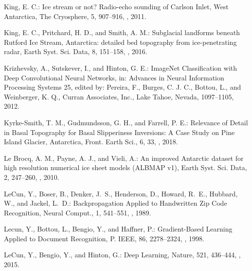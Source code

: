 \documentclass[tc, noline]{copernicus}
\begin{document}
\begin{thebibliography}{95}
King, E. C.: Ice stream or not? Radio-echo sounding of Carlson Inlet, West Antarctica, The Cryosphere, 5, 907--916, , 2011.

King, E. C., Pritchard, H. D., and Smith, A. M.: Subglacial landforms beneath Rutford Ice Stream, Antarctica: detailed bed topography from ice-penetrating radar, Earth Syst. Sci. Data, 8, 151--158, , 2016.

Krizhevsky, A., Sutskever, I., and Hinton, G. E.: ImageNet Classification with Deep Convolutional Neural Networks, in: Advances in Neural Information Processing Systems 25, edited by: Pereira, F., Burges, C. J. C., Bottou, L., and Weinberger, K. Q., Curran Associates, Inc., Lake Tahoe, Nevada, 1097--1105, 2012.

Kyrke-Smith, T. M., Gudmundsson, G. H., and Farrell, P. E.: Relevance of Detail in Basal Topography for Basal Slipperiness Inversions: A Case Study on Pine Island Glacier, Antarctica, Front. Earth Sci., 6, 33, , 2018.


Le Brocq, A. M., Payne, A. J., and Vieli, A.: An improved Antarctic dataset for high resolution numerical ice sheet models (ALBMAP v1), Earth Syst. Sci. Data, 2, 247--260, , 2010.

LeCun, Y., Boser, B., Denker, J.~S., Henderson, D., Howard, R.~E., Hubbard, W., and Jackel, L.~D.:
Backpropagation Applied to Handwritten Zip Code Recognition,
Neural Comput.,
1, 541--551, , 1989.

Lecun, Y., Bottou, L., Bengio, Y., and Haffner, P.:
Gradient-Based Learning Applied to Document Recognition,
P. IEEE,
86, 2278--2324, , 1998.

LeCun, Y., Bengio, Y., and Hinton, G.:
Deep Learning,
Nature,
521, 436--444, , 2015.


\end{thebibliography}
\end{document}
